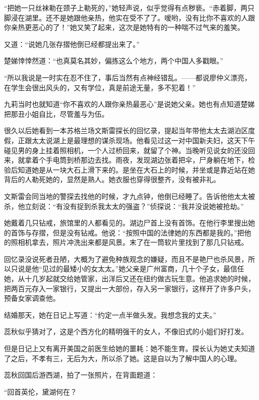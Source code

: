 \par “把她一只丝袜勒在颈子上勒死的，”她轻声说，似乎觉得有点秽亵。“赤着脚，两只脚浸在湖里。还不是她跟他亲热，他实在受不了了。嗳哟，没有比你不喜欢的人跟你亲热更恶心的了！”她又笑了起来，这次是她特有的一种喘不过气来的羞笑。
\par 又道：“说她几张存摺他倒已经都提出来了。”
\par 楚娣悻悻然道：“也真莫名其妙，偏拣这么个地方，两个中国人多戳眼。”
\par “所以我说是一时实在忍不住了，事后当然有点神经错乱。——都说廖仲义漂亮，在学生会很出风头的，又有学位，真是前途无量，多不犯着！”
\par 九莉当时也就知道“你不喜欢的人跟你亲热最恶心”是说她父亲。她也有点知道楚娣把那丑小姐自比，尽管羞与为伍。
\par 很久以后她看到一本苏格兰场文斯雷探长的回忆录，提起当年带他太太去湖泊区度假，正跟太太说湖上是最理想的谋杀现场。他看见过这一对中国新夫妇，这天下午碰见男的身上挂着照相机，一个人过桥回来，就留了个神。当晚听见说女的还没回来，就拿着个手电筒到桥那边去找。雨夜，发现湖边张着把伞，尸身躺在地下，检验后知道她是从一块大石上滑下来的。是坐在大石上的时候，并坐或是靠近站在她背后的人勒死她的，显然是熟人。她衣服也穿得很整齐，没有被非礼。
\par 文斯雷会同当地的警探去找他的时候，才九点钟，他倒已经睡了。告诉他他太太被杀，他立刻说：“有没有捉到杀我太太的强盗？”侦探说：“我并没说她被抢劫。”
\par 她戴着几只钻戒，旅馆里的人都看见的。湖边尸首上没有首饰。在他行李里搜出她的首饰与存摺，但是没有钻戒。他说：“按照中国的法律她的东西都是我的。”把他的照相机拿去，照片冲洗出来都是风景。末了在一筒软片里找到了那几只钻戒。
\par 回忆录没说死者丑陋，大概为了避免种族观念的嫌疑，而且不是艳尸也杀风景，所以只说是他“见过的最矮小的女太太。”她父亲是广州富商，几十个子女，最信任她，从十几岁起就交给她管家，出洋后又还在纽约做古玩生意。他追求她的时候，把两百元存入一家银行，又提出一大部份，存入另一家银行，这样开了许多户头，预备女家调查他。
\par 结婚那天，她在日记上写道：“约定一点半做头发。我想念我的丈夫。”
\par 蕊秋似乎猜对了，这是个西方化的精明强干的女人，不像旧式的小姐们好打发。
\par 但是日记上又有离开美国之前医生给她的噩耗：她不能生育。探长认为她丈夫知道了之后，不孝有三，无后为大，所以杀了她。这是自以为了解中国人的心理。
\par 蕊秋回国后游西湖，拍了一张照片，在背面题道：
\par “回首英伦，黛湖何在？

